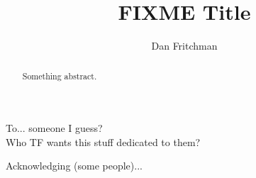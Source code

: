 \documentclass{ucbthesis}
\begin{document}
\title{FIXME Title}
\author{Dan Fritchman}

\maketitle
\copyrightpage

\begin{abstract}
Something abstract. 
\end{abstract}


\begin{frontmatter}

\begin{dedication}
\null\vfil
\begin{center}
To... someone I guess?\\\vspace{12pt}
Who TF wants this stuff dedicated to them? 
\end{center}
\vfil\null
\end{dedication}


\tableofcontents
\clearpage
\listoffigures
\clearpage
\listoftables

\begin{acknowledgements}
Acknowledging (some people)...
\end{acknowledgements}

\end{frontmatter}

\pagestyle{headings}

\begin{markdown}



\end{markdown}

\printbibliography
\end{document}
